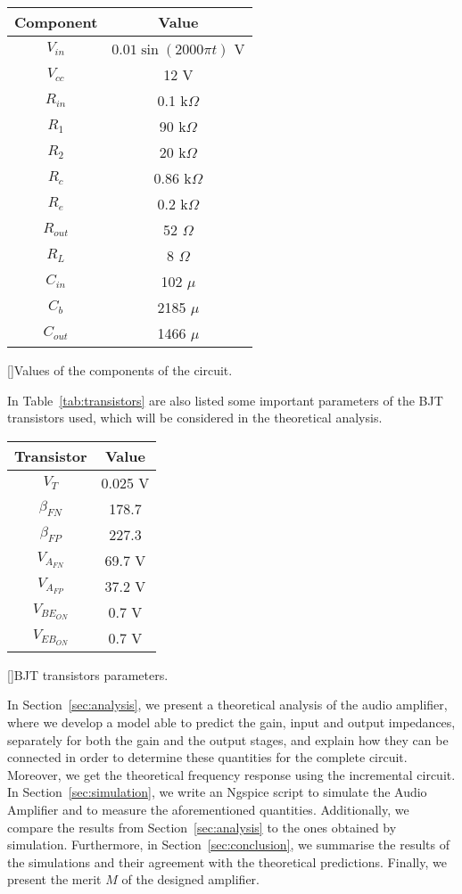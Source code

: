 \begin{center} 
\begin{tabular}{ | c | c | }
\hline
\textbf{Component} & \textbf{Value} \\
\hline
$V_{in}$ & $0.01\sin{(2000\pi t)}$ V \\
\hline
$V_{cc}$ & 12 V \\
\hline
$R_{in}$ & 0.1 k$\Omega$ \\
\hline
$R_1$ & 90 k$\Omega$ \\
\hline
$R_2$ & 20 k$\Omega$ \\
\hline
$R_c$ & 0.86 k$\Omega$ \\
\hline
$R_e$ & 0.2 k$\Omega$ \\
\hline
$R_{out}$ & 52 $\Omega$ \\
\hline
$R_L$ & 8 $\Omega$ \\
\hline
$C_{in}$ & 102 $\mu$ \\
\hline
$C_b$ & 2185 $\mu$ \\
\hline
$C_{out}$ & 1466 $\mu$ \\
\hline
\end{tabular}
[]{Values of the components of the circuit.}
\label{tab:components}
\end{center}

In Table~\ref{tab:transistors} are also listed some important parameters of the BJT transistors used, which will be considered in the theoretical analysis.

\begin{center}
\begin{tabular}{ | c | c | }
\hline
\textbf{Transistor} & \textbf{Value}\\
\hline
$V_T$ & 0.025 V \\
\hline
$\beta_{FN}$ & 178.7 \\
\hline
$\beta_{FP}$ & 227.3 \\
\hline
$V_{A_{FN}}$ & 69.7 V \\
\hline
$V_{A_{FP}}$ & 37.2 V \\
\hline
$V_{{BE}_{ON}}$ & 0.7 V \\
\hline
$V_{{EB}_{ON}}$ & 0.7 V \\
\hline
\end{tabular}
[]{BJT transistors parameters.}
\label{tab:transistors}
\end{center}

In Section~\ref{sec:analysis}, we present a theoretical analysis of the audio amplifier, where we develop a model able to predict the gain, input and output impedances, separately for both the gain and the output stages, and explain how they can be connected in order to determine these quantities for the complete circuit. Moreover, we get the theoretical frequency response using the incremental circuit. In Section~\ref{sec:simulation}, we write an Ngspice script to simulate the Audio Amplifier and to measure the aforementioned quantities. Additionally, we compare the results from Section~\ref{sec:analysis} to the ones obtained by simulation. Furthermore, in Section~\ref{sec:conclusion}, we summarise the results of the simulations and their agreement with the theoretical predictions. Finally, we present the merit $M$ of the designed amplifier.


